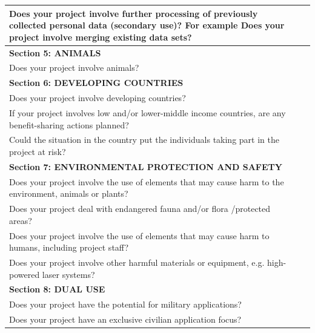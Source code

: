 \documentclass[12pt,twoside]{report}
\begin{document}
{\begin{longtable}{ |p{13.2cm}|p{0.6cm}|p{0.6cm}| }
Does your project involve further processing of previously collected personal data (secondary use)? For example Does your project involve merging existing data sets? & & \\
\hline

\multicolumn{3}{|l|}{\cellcolor{green!25}\bf Section 5: ANIMALS} \\
\hline

Does your project involve animals? & & \\
\hline


\multicolumn{3}{|l|}{\cellcolor{green!25}\bf Section 6: DEVELOPING COUNTRIES} \\
\hline

Does your project involve developing countries? & & \\
\hline

If your project involves low and/or lower-middle income countries, are any benefit-sharing actions planned? & & \\
\hline

Could the situation in the country put the individuals taking part in the project at risk? & & \\
\hline

\multicolumn{3}{|l|}{\cellcolor{green!25}\bf Section 7: ENVIRONMENTAL PROTECTION AND SAFETY} \\
\hline

Does your project involve the use of elements that may cause harm to the environment, animals or plants? & & \\
\hline

Does your project deal with endangered fauna and/or flora /protected areas? & & \\
\hline

Does your project involve the use of elements that may cause harm to humans, including project staff? & & \\
\hline

Does your project involve other harmful materials or equipment, e.g. high-powered laser systems? & & \\
\hline


\multicolumn{3}{|l|}{\cellcolor{green!25}\bf Section 8: DUAL USE} \\
\hline

Does your project have the potential for military applications? & & \\
\hline

Does your project have an exclusive civilian application focus? & & \\
\hline


\end{longtable}}
\end{document}
